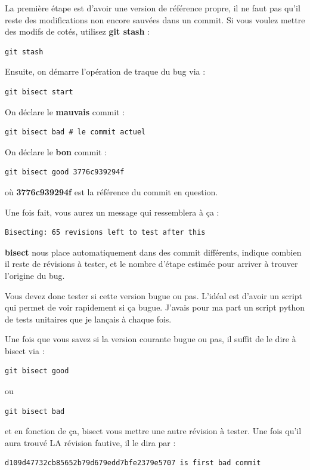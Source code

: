 \documentclass[a4paper,twoside]{article}
\begin{document}
\bigskip

La première étape est d'avoir une version de référence propre, il ne faut pas qu'il reste des modifications non encore sauvées dans un commit. Si vous voulez mettre des modifs de cotés, utilisez \textbf{git stash} : 
\begin{verbatim}
git stash
\end{verbatim}

Ensuite, on démarre l'opération de traque du bug via :
\begin{verbatim}
git bisect start
\end{verbatim}

On déclare le \textbf{mauvais} commit :
\begin{verbatim}
git bisect bad # le commit actuel
\end{verbatim}

On déclare le \textbf{bon} commit : 
\begin{verbatim}
git bisect good 3776c939294f
\end{verbatim}
où \textbf{3776c939294f} est la référence du commit en question. 

\bigskip

Une fois fait, vous aurez un message qui ressemblera à ça :
\begin{verbatim}
Bisecting: 65 revisions left to test after this
\end{verbatim}

\textbf{bisect} nous place automatiquement dans des commit différents, indique combien il reste de révisions à tester, et le nombre d'étape estimée pour arriver à trouver l'origine du bug. 

Vous devez donc tester si cette version bugue ou pas. L'idéal est d'avoir un script qui permet de voir rapidement si ça bugue. J'avais pour ma part un script python de tests unitaires que je lançais à chaque fois. 

Une fois que vous savez si la version courante bugue ou pas, il suffit de le dire à bisect via : 
\begin{verbatim}
git bisect good
\end{verbatim}
ou
\begin{verbatim}
git bisect bad
\end{verbatim}
et en fonction de ça, bisect vous mettre une autre révision à tester. Une fois qu'il aura trouvé LA révision fautive, il le dira par :
\begin{verbatim}
d109d47732cb85652b79d679edd7bfe2379e5707 is first bad commit
\end{verbatim}
\end{document}
